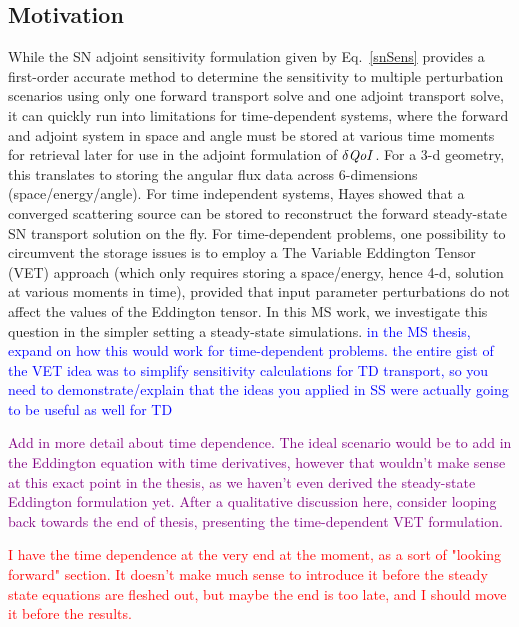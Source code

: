 \documentclass[12pt]{report}
\newcommand{\qoi}{{\it QoI}\xspace}
\newcommand{\comment}[2]{\marginpar{\textcolor{#2}{$\star$}}\textcolor{#2}{#1}\newline}
\newcommand{\iwh}[1]{\comment{#1}{red}}
\newcommand{\jcr}[1]{\comment{#1}{blue}}
\newcommand{\todo}[1]{\comment{#1}{purple}}
\newcommand{\iwh}[1]{\phantom{a}}
\newcommand{\jcr}[1]{\phantom{a}}
\newcommand{\todo}[1]{\phantom{a}}
\begin{document}
\subsection{Motivation} 
While the SN adjoint sensitivity formulation given by Eq.~\eqref{snSens} provides a first-order accurate method to determine the sensitivity to multiple perturbation scenarios using only one forward transport solve and one adjoint transport solve, it can quickly run into limitations for time-dependent systems, where the forward and adjoint system in space and angle must be stored at various time moments for retrieval later for use in the adjoint formulation of $\delta \qoi$. For a 3-d geometry, this translates to storing the angular
flux data across 6-dimensions (space/energy/angle). For time independent systems, Hayes \cite{Stripling} showed that a converged scattering source can be stored to reconstruct 
the forward steady-state SN transport solution on the fly. For time-dependent problems, one possibility to circumvent the storage issues is to employ a The Variable Eddington Tensor (VET) approach (which only requires
storing a space/energy, hence 4-d, solution at various moments in time), provided that input parameter perturbations do not affect the values of the Eddington tensor. In this MS work,
we investigate this question in the simpler setting a steady-state simulations.
\jcr{in the MS thesis, expand on how this would work for time-dependent problems. the entire
gist of the VET idea was to simplify sensitivity calculations for TD transport, so you need
to demonstrate/explain that the ideas you applied in SS were actually going to be useful as well for TD}

\todo{Add in more detail about time dependence. The ideal scenario would be to add in the Eddington equation with time derivatives, however that wouldn't make sense at this exact point in the thesis, as we haven't even derived the steady-state Eddington formulation yet. After a qualitative discussion here, consider looping back towards the end of thesis, presenting the time-dependent VET formulation.}

\iwh{I have the time dependence at the very end at the moment, as a sort of "looking forward" section. It doesn't make much sense to introduce it before the steady state equations are fleshed out, but maybe the end is too late, and I should move it before the results.}

\end{document}
